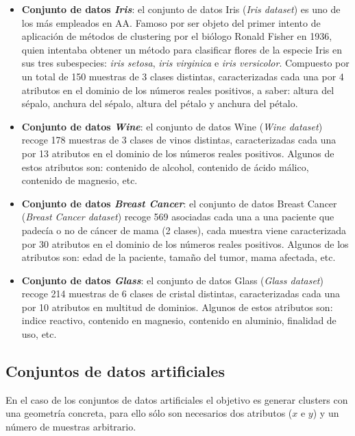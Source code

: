 \begin{itemize}
	
	\item \textbf{Conjunto de datos \textit{Iris}}: el conjunto de datos Iris (\textit{Iris dataset}) es uno de los más empleados en \acs{AA}. Famoso por ser objeto del primer intento de aplicación de métodos de clustering por el biólogo Ronald Fisher en 1936, quien intentaba obtener un método para clasificar flores de la especie Iris en sus tres subespecies: \textit{iris setosa}, \textit{iris virginica} e \textit{iris versicolor}. Compuesto por un total de 150 muestras de 3 clases distintas, caracterizadas cada una por 4 atributos en el dominio de los números reales positivos, a saber: altura del sépalo, anchura del sépalo, altura del pétalo y anchura del pétalo.
	
	\item \textbf{Conjunto de datos \textit{Wine}}: el conjunto de datos Wine (\textit{Wine dataset}) recoge 178 muestras de 3 clases de vinos distintas, caracterizadas cada una por 13 atributos en el dominio de los números reales positivos. Algunos de estos atributos son: contenido de alcohol, contenido de ácido málico, contenido de magnesio, etc.
	
	\item \textbf{Conjunto de datos \textit{Breast Cancer}}: el conjunto de datos Breast Cancer (\textit{Breast Cancer dataset}) recoge 569 asociadas cada una a una paciente que padecía o no de cáncer de mama (2 clases), cada muestra viene caracterizada por 30 atributos en el dominio de los números reales positivos. Algunos de los atributos son: edad de la paciente, tamaño del tumor, mama afectada, etc.
	
	\item \textbf{Conjunto de datos \textit{Glass}}: el conjunto de datos Glass (\textit{Glass dataset}) recoge 214 muestras de 6 clases de cristal distintas, caracterizadas cada una por 10 atributos en multitud de dominios. Algunos de estos atributos son: indice reactivo, contenido en magnesio, contenido en aluminio, finalidad de uso, etc.
	
\end{itemize}

\subsection{Conjuntos de datos artificiales}

En el caso de los conjuntos de datos artificiales el objetivo es generar clusters con una geometría concreta, para ello sólo son necesarios dos atributos ($x$ e $y$) y un número de muestras arbitrario.

